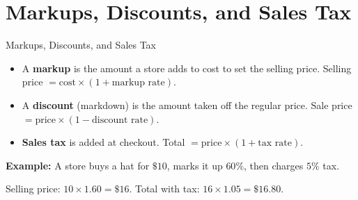 \section{Markups, Discounts, and Sales Tax}

\begin{quickReview}{Markups, Discounts, and Sales Tax}
\begin{itemize}[leftmargin=*]
    \item A \textbf{markup} is the amount a store adds to cost to set the selling price.
          Selling price $= \text{cost} \times (1 + \text{markup rate})$.
    \item A \textbf{discount} (markdown) is the amount taken off the regular price.
          Sale price $= \text{price} \times (1 - \text{discount rate})$.
    \item \textbf{Sales tax} is added at checkout.
          Total $= \text{price} \times (1 + \text{tax rate})$.
\end{itemize}

\medskip
\textbf{Example:} A store buys a hat for $\$10$, marks it up $60\%$, then charges $5\%$ tax.

Selling price: $10 \times 1.60 = \$16$. \quad Total with tax: $16 \times 1.05 = \$16.80$.
\end{quickReview}

